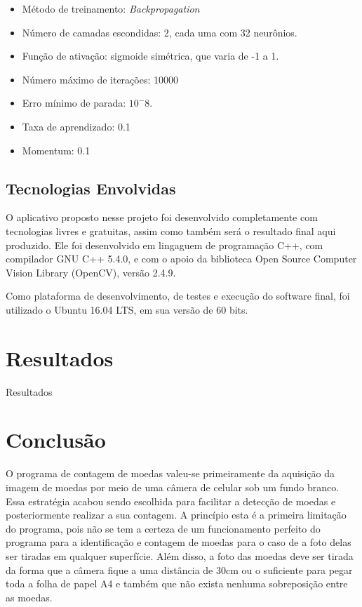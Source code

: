 \documentclass[10pt,journal,compsoc]{IEEEtran}
\begin{document}
\begin{itemize}  
\item Método de treinamento: \textit{Backpropagation}
\item Número de camadas escondidas: 2, cada uma com 32 neurônios.
\item Função de ativação: sigmoide simétrica, que varia de -1 a 1.
\item Número máximo de iterações: 10000
\item Erro mínimo de parada:  $10 ^ -8$.
\item Taxa de aprendizado: 0.1
\item Momentum: 0.1

\end{itemize}



\subsection{Tecnologias Envolvidas}
\label{sec:metodologia:tecnologias-envolvidas}

O aplicativo proposto nesse projeto foi desenvolvido completamente com tecnologias livres e gratuitas, assim como também será o resultado final aqui produzido. Ele foi desenvolvido em lingaguem de programação C++, com compilador GNU C++ 5.4.0, e com o apoio da biblioteca Open Source Computer Vision Library (OpenCV), versão 2.4.9. 

Como plataforma de desenvolvimento, de testes e execução do software final, foi utilizado o Ubuntu 16.04 LTS, em sua versão de 60 bits.

\section{Resultados}
\label{sec:resultados}

Resultados

\section{Conclusão}
\label{sec:conclusao}

O programa de contagem de moedas valeu-se primeiramente da aquisição da imagem de moedas por meio de uma câmera de celular sob um fundo branco. Essa estratégia acabou sendo escolhida para facilitar a detecção de moedas e posteriormente realizar a sua contagem. A princípio esta é a primeira limitação do programa, pois não se tem a certeza de um funcionamento perfeito do programa para a identificação e contagem de moedas para o caso de a foto delas ser tiradas em qualquer superfície. Além disso, a foto das moedas deve ser tirada da forma que a câmera fique a uma distância de 30cm ou o suficiente para pegar toda a folha de papel A4 e também que não exista nenhuma sobreposição entre as moedas.
\end{document}
